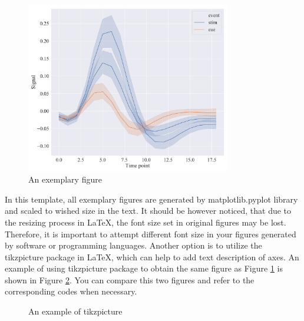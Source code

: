 	\begin{figure}[h!]
		\centering
		\includegraphics[width=0.8\textwidth]{fig_1.pdf} 
		\caption{An exemplary figure} 
		\label{fig_1} 
	\end{figure} 

	In this template, all exemplary figures are generated by matplotlib.pyplot library and scaled to wished size in the text. It should be however noticed, that due to the resizing process in \LaTeX, the font size set in original figures may be lost. Therefore, it is important to attempt different font size in your figures generated by software or programming languages. Another option is to utilize the {\color{blue}tikzpicture} package in \LaTeX, which can help to add text description of axes. An example of using {\color{blue}tikzpicture} package to obtain the same figure as Figure \ref{fig_1} is shown in Figure \ref{tikzpic}. You can compare this two figures and refer to the corresponding codes when necessary.

	\begin{figure}[h!]
		\centering
		\caption{An example of tikzpicture}
		\label{tikzpic}
	\end{figure}

